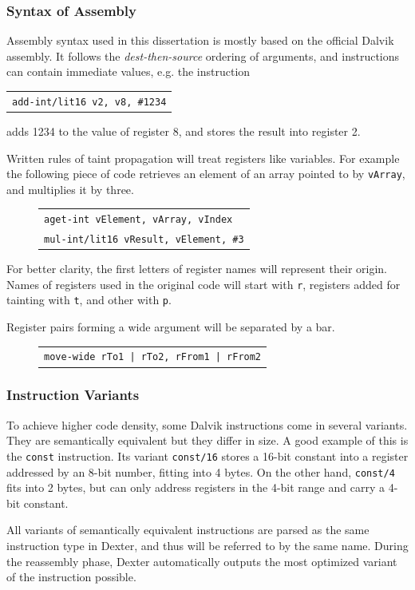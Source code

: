 \documentclass[12pt,twoside,notitlepage]{report}
\newcommand{\centerbox}[1] {
	\begin{center}
	\begin{footnotesize}
	\begin{tabular}{l}
		#1
	\end{tabular}
	\end{footnotesize}
	\end{center}
}
\newcommand{\asm}[1] {\texttt{#1}}
\begin{document}
\subsubsection{Syntax of Assembly}
Assembly syntax used in this dissertation is mostly based on the official Dalvik assembly. It follows the \emph{dest-then-source} ordering of arguments, and instructions can contain immediate values, e.g. the instruction
		\centerbox{
			\asm{add-int/lit16 v2, v8, \#1234}
		}
adds 1234 to the value of register 8, and stores the result into register 2. 

Written rules of taint propagation will treat registers like variables. For example the following piece of code retrieves an element of an array pointed to by \verb$vArray$, and multiplies it by three.
	\begin{figure}[H]
		\centerbox{
			\asm{aget-int vElement, vArray, vIndex} \\
			\asm{mul-int/lit16 vResult, vElement, \#3}
		}
	\end{figure}

For better clarity, the first letters of register names will represent their origin. Names of registers used in the original code will start with \verb$r$, registers added for tainting with \verb$t$, and other with \verb$p$.

Register pairs forming a wide argument will be separated by a bar.
	\begin{figure}[H]
		\centerbox{
			\asm{move-wide rTo1 | rTo2, rFrom1 | rFrom2}
		}
	\end{figure}

\subsubsection{Instruction Variants}

To achieve higher code density, some Dalvik instructions come in several variants. They are semantically equivalent but they differ in size. A good example of this is the \verb$const$ instruction. Its variant \verb$const/16$ stores a 16-bit constant into a register addressed by an 8-bit number, fitting into 4 bytes. On the other hand, \verb$const/4$ fits into 2 bytes, but can only address registers in the 4-bit range and carry a 4-bit constant.

All variants of semantically equivalent instructions are parsed as the same instruction type in Dexter, and thus will be referred to  by the same name. During the reassembly phase, Dexter automatically outputs the most optimized variant of the instruction possible.
\end{document}
